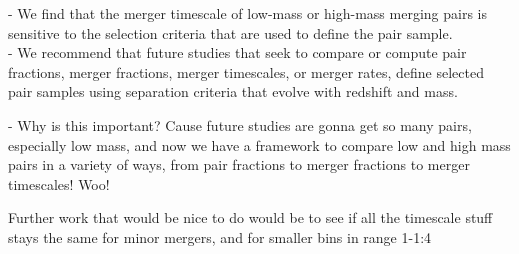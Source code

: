 \documentclass[twocolumn,linenumbers]{aastex631}
\begin{document}
    - We find that the merger timescale of low-mass or high-mass merging pairs is sensitive to the selection criteria that are used to define the pair sample.\\
    
    - We recommend that future studies that seek to compare or compute pair fractions, merger fractions, merger timescales, or merger rates, define selected pair samples using separation criteria that evolve with redshift and mass. 
    
    - Why is this important? Cause future studies are gonna get so many pairs, especially low mass, and now we have a framework to compare low and high mass pairs in a variety of ways, from pair fractions to merger fractions to merger timescales! Woo!
    
    Further work that would be nice to do would be to see if all the timescale stuff stays the same for minor mergers, and for smaller bins in range 1-1:4










{}

\end{document}
